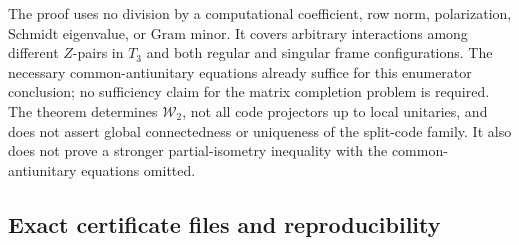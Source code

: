 \begin{remark}
The proof uses no division by a computational coefficient, row norm,
polarization, Schmidt eigenvalue, or Gram minor. It covers arbitrary
interactions among different \(Z\)-pairs in \(T_3\) and both regular
and singular frame configurations. The necessary common-antiunitary
equations already suffice for this enumerator conclusion; no
sufficiency claim for the matrix completion problem is required.
The theorem determines \(\mathcal W_2\), not all code projectors up to
local unitaries, and does not assert global connectedness or uniqueness
of the split-code family. It also does not prove a stronger
partial-isometry inequality with the common-antiunitary equations
omitted.
\end{remark}

\subsection{Exact certificate files and reproducibility}
\label{o2gc:subsec-reproducibility}

